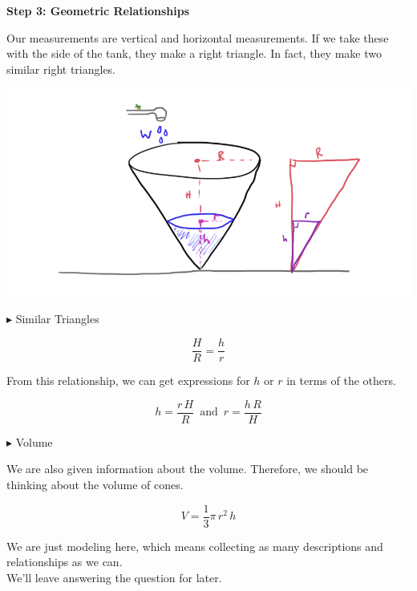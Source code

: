 \documentclass{ximera}
\begin{document}
\textbf{\textcolor{purple!85!blue}{Step 3: Geometric Relationships}}


Our measurements are vertical and horizontal measurements.  If we take these with the side of the tank, they make a right triangle.  In fact, they make two similar right triangles.






\begin{image}
\includegraphics{pics/cone_5.png}
\end{image}




$\blacktriangleright$ Similar Triangles



\[
\frac{H}{R} = \frac{h}{r}
\]


From this relationship, we can get expressions for $h$ or $r$ in terms of the others. 



\[
h = \frac{r \, H}{R} \, \text{ and } \,  r = \frac{h \, R}{H}
\]







$\blacktriangleright$ Volume


We are also given information about the volume.  Therefore, we should be thinking about the volume of cones.

\[
V = \frac{1}{3} \pi \, r^2 \, h
\]







We are just modeling here, which means collecting as many descriptions and relationships as we can. \\

We'll leave answering the question for later.
\end{document}
